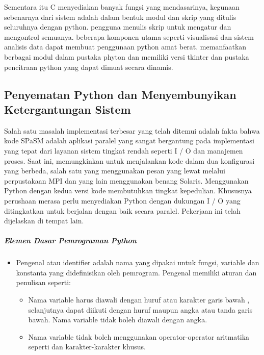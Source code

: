 \documentclass[12pt,a4paper]{article}
\begin{document}
Sementara itu C menyediakan banyak fungsi yang mendasarinya, kegunaan sebenarnya dari sistem adalah dalam bentuk modul dan skrip yang ditulis seluruhnya dengan python. pengguna menulis skrip untuk mengatur dan mengontrol semuanya. beberapa komponen utama seperti visualisasi dan sistem analisis data dapat membuat penggunaan python amat berat. memanfaatkan berbagai modul dalam pustaka phyton dan memiliki versi tkinter dan pustaka pencitraan python yang dapat dimuat secara dinamis.

\subsection{Penyematan Python dan Menyembunyikan Ketergantungan Sistem}
Salah satu masalah implementasi terbesar yang telah ditemui adalah fakta bahwa kode SPaSM adalah aplikasi paralel yang sangat bergantung pada implementasi yang tepat dari layanan sistem tingkat rendah seperti I / O dan manajemen proses. Saat ini, memungkinkan untuk menjalankan kode dalam dua konfigurasi yang berbeda, salah satu yang menggunakan pesan yang lewat melalui perpustakaan MPI dan yang lain menggunakan benang Solaris. Menggunakan Python dengan kedua versi kode membutuhkan tingkat kepedulian. Khususnya perushaan merasa perlu menyediakan Python dengan dukungan I / O yang ditingkatkan untuk berjalan dengan baik secara paralel. Pekerjaan ini telah dijelaskan di tempat lain.

\subparagraph{Elemen Dasar Pemrograman Python}

\begin{itemize}

\item Pengenal atau identifier adalah nama yang dipakai untuk fungsi, variable dan konstanta yang didefinisikan oleh pemrogram. Pengenal memiliki aturan dan penulisan seperti:

\begin{itemize}

\item Nama variable harus diawali dengan huruf atau karakter garis bawah , selanjutnya dapat diikuti dengan huruf maupun angka atau tanda garis bawah. Nama variable tidak boleh diawali dengan angka.
\item Nama variable tidak boleh menggunakan operator-operator aritmatika seperti dan karakter-karakter khusus. 
\end{itemize}

\end{itemize}
\end{document}
